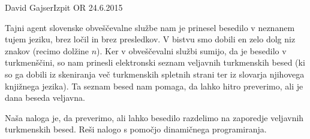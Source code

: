 \begin{naloga}{David Gajser}{Izpit OR 24.6.2015}
\begin{vprasanje}
Tajni agent slovenske obveščevalne službe
nam je prinesel besedilo v neznanem tujem jeziku,
brez ločil in brez presledkov.
V bistvu smo dobili en zelo dolg niz znakov (recimo dolžine $n$).
Ker v obveščevalni službi sumijo, da je besedilo v turkmenščini,
so nam prinesli elektronski seznam veljavnih turkmenskih besed
(ki so ga dobili iz skeniranja več turkmenskih spletnih strani
ter iz slovarja njihovega knjižnega jezika).
Ta seznam besed nam pomaga, da lahko hitro preverimo,
ali je dana beseda veljavna.

Naša naloga je, da preverimo,
ali lahko besedilo razdelimo na zaporedje veljavnih turkmenskih besed.
Reši nalogo s pomočjo dinamičnega programiranja.
\end{vprasanje}
\begin{odgovor}
\end{odgovor}
\end{naloga}
